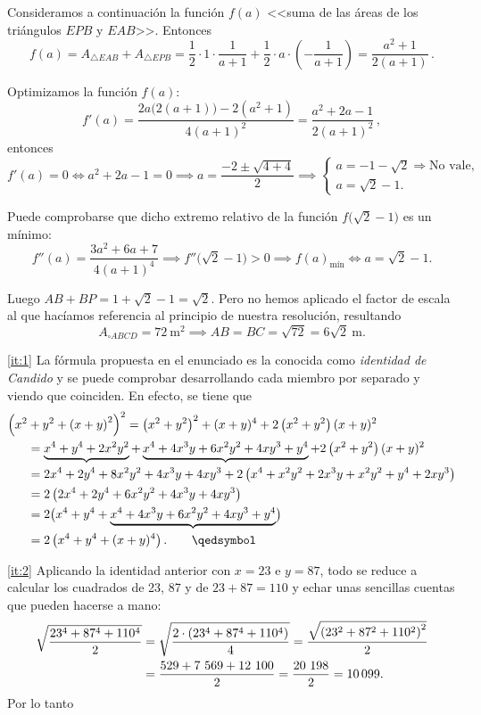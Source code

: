 \documentclass[
  fecha={5 de agosto de 2025},
  palabrasclave={RetoSecundaria, ago2025, álgebra, dif1},
  codigo=minted
]{RetoMatematico}
\begin{document}
Consideramos a continuación la función \(f(a)\) <<suma de las áreas de los triángulos \(EPB\) y \(EAB\)>>. Entonces
\[
f(a)=A_{\triangle EAB}+A_{\triangle EPB}=\frac{1}{2}\cdot 1\cdot \frac{1}{a+1}+\frac{1}{2}\cdot a\cdot\left(-\frac{1}{a+1}\right)=\frac{a^2+1}{2(a+1)}\,.
\]

Optimizamos la función \(f(a)\):
\[
f'(a)=\frac{2a\big(2(a+1)\big)-2(a^2+1)}{4(a+1)^2}=\frac{a^2+2a-1}{2(a+1)^2}\,,
\]
entonces
\[
f'(a)=0\iff a^2+2a-1=0\implies a=\frac{-2\pm\sqrt{4+4}}{2}\implies
\begin{cases}a=-1-\sqrt{2}\Rightarrow\text{No vale},\\a=\sqrt{2}-1.
\end{cases}
\]

Puede comprobarse que dicho extremo relativo de la función \(f\big(\sqrt{2}-1\big)\) es un mínimo:
\[
f''(a)=\frac{3a^2+6a+7}{4(a+1)^4}\implies f''\big(\sqrt{2}-1\big)>0\implies f(a)_{\text{mín}}\iff a=\sqrt{2}-1.
\]

Luego \(AB+BP=1+\sqrt{2}-1=\sqrt{2}\). Pero no hemos aplicado el factor de escala al que hacíamos referencia al principio de nuestra resolución, resultando
\[
A_{\square ABCD}=72\ \text{m}^2\implies AB=BC=\sqrt{72}=6\sqrt{2}\ \text{m}.
\]


\ref{it:1} La fórmula propuesta en el enunciado es la conocida como \emph{identidad de Candido} y se puede comprobar desarrollando cada miembro por separado y viendo que coinciden. En efecto, se tiene que
\begin{align*}
\Bigl(x^2&+y^2+\l(x+y\r)^2\Bigr)^2 = \l(x^2 + y^2\r)^2 + (x+y)^4 + 2\l(x^2 + y^2\r)(x+y)^2\\
&= \underbrace{x^4 + y^4 + 2x^2y^2}+\underbrace{x^4 + 4x^3y + 6x^2y^2 + 4xy^3 + y^4} + 2\l(x^2 + y^2\r)(x+y)^2\\
&= 2x^4 + 2y^4 + 8x^2y^2 + 4x^3y + 4xy^3 + 2\l(x^4 + x^2y^2 + 2x^3 y + x^2 y^2 + y^4 + 2xy^3\r)\\
&= 2\l(2x^4 + 2y^4 + 6x^2y^2 + 4x^3 y + 4xy^3\r)\\
&= 2\bigl(x^4 + y^4 + \underbrace{x^4 + 4x^3 y + 6x^2y^2 + 4xy^3 + y^4}\bigr)\\
&= 2\l(x^4 + y^4 + (x+y)^4\r). \tag*{\qedsymbol}
\end{align*}

\ref{it:2} Aplicando la identidad anterior con $x = 23$ e $y = 87$, todo se reduce a calcular los
cuadrados de 23, 87 y de $23 + 87 = 110$ y echar unas sencillas cuentas que pueden hacerse
a mano:
\begin{align*}
\sqrt{\frac{23^4+87^4+110^4}{2}} &= \sqrt{\frac{2\cdot\left(23^4+87^4+110^4\right)}{4}} = \frac{\sqrt{\left(23^2+87^2+110^2\right)^2}}{2}\\
&= \frac{529 + 7\ 569 + 12\ 100}{2} = \frac{20\ 198}{2} = \num{10099}.
\end{align*} Por lo tanto 
\end{document}
